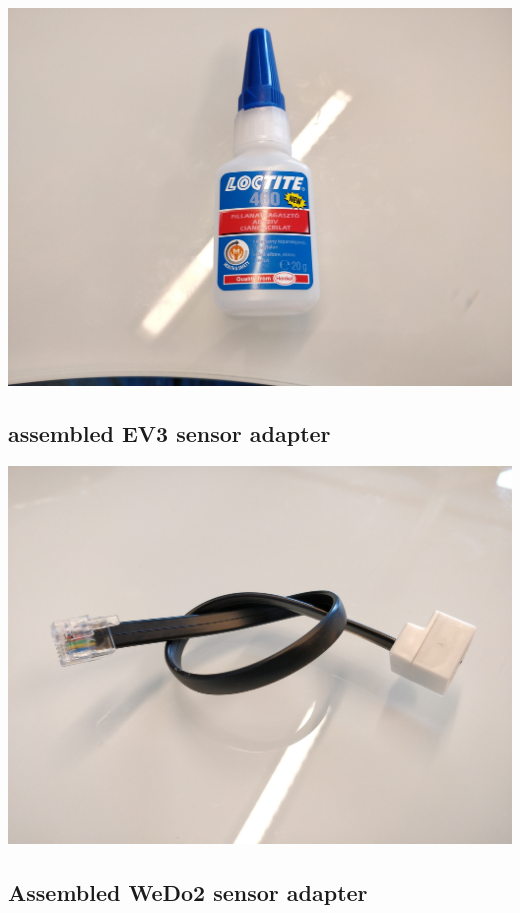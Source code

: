 \documentclass[a4paper,12pt]{article}
\begin{document}
\includegraphics[width=13.5cm]{superglue.jpg}

\subsection{assembled EV3 sensor adapter}

\includegraphics[width=13.5cm]{ev3-sensor-adapter.jpg}

\subsection{Assembled WeDo2 sensor adapter}
\end{document}
